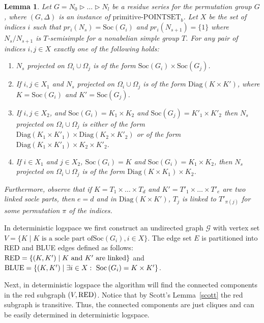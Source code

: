 \documentclass[11pt]{article}
\newtheorem{lemma}[theorem]{Lemma}
\newcommand{\red}{\mbox{\rm RED}}
\newcommand{\blue}{\mbox{\rm BLUE}}
\newcommand{\prpsb}[1]{\ensuremath{\textrm{primitive-POINTSET}_{#1}}}
\newcommand{\Soc}[1]{\ensuremath{\mathrm{Soc}\left(#1\right)}}
\newcommand{\Diag}[1]{\ensuremath{\mathrm{Diag}\left({#1}\right)}}
\newcommand{\pr}[2]{\ensuremath{pr_{#1}\left({#2}\right)}}
\begin{document}
\begin{lemma}\label{lem-link}
Let $G = N_0 \rhd \ldots \rhd N_l$ be a residue series for the
permutation group $G$, where $(G,\Delta)$ is an instance of
$\prpsb{b}$. Let $X$ be the set of indices $i$ such that
$\pr{i}{N_s}=\Soc{G_i}$ and $\pr{i}{N_{s+1}}=\{1\}$ where
$N_s/N_{s+1}$ is $T$-semisimple for a nonabelian simple group $T$.
For any pair of indices $i, j\in X$ exactly one of the following
holds:
\begin{enumerate}
\item[(a)] $N_s$ projected on $\Omega_i\cup \Omega_j$ is
of the form $\Soc{G_i}\times\Soc{G_j}$.

\item[(b)] If $i,j\in X_1$ and $N_s$ projected on $\Omega_i\cup \Omega_j$
is of the form $\Diag{K\times K'}$, where $K=\Soc{G_i}$ and
$K'=\Soc{G_j}$.

\item[(c)] If $i,j\in X_2$, and $\Soc{G_i}=K_1\times K_2$ and
$\Soc{G_j}=K'_1\times K'_2$ then $N_s$ projected on $\Omega_i\cup
\Omega_j$ is either of the form $\Diag{K_1\times
K'_1}\times\Diag{K_2\times K'_2}$ or of the form $\Diag{K_1\times
K'_1}\times K_2\times K'_2$.

\item[(d)] If $i\in X_1$ and $j\in X_2$, $\Soc{G_i}=K$ and
$\Soc{G_i}=K_1\times K_2$, then $N_s$ projected on $\Omega_i\cup
\Omega_j$ is of the form $\Diag{K\times K_1}\times K_2$.
\end{enumerate}

Furthermore, observe that if $K=T_1\times\ldots\times T_d$ and
$K'=T'_1\times\ldots\times T'_e$ are two linked socle parts, then $e=d$
and in $\Diag{K\times K'}$, $T_j$ is linked to $T'_{\pi(j)}$ for
some permutation $\pi$ of the indices.
\end{lemma}


In deterministic logspace we first construct an undirected graph
$\mathcal{G}$ with vertex set $V=\{K\mid K\textrm{ is a socle part of
}\Soc{G_i}, i\in X\}$. The edge set $E$ is partitioned into RED and
BLUE edges defined as follows: $\red=\{(K,K')\mid K\textrm{ and }
K'\textrm{ are linked}\}$ and $\blue=\{(K,K')\mid \exists i\in
X:~\Soc{G_i}=K\times K'\}$.

Next, in deterministic logspace the algorithm will find the connected
components in the red subgraph $(V,\red)$. Notice that by Scott's
Lemma~\ref{scott} the red subgraph is transitive. Thus, the connected
components are just cliques and can be easily determined in
deterministic logspace.
\end{document}
